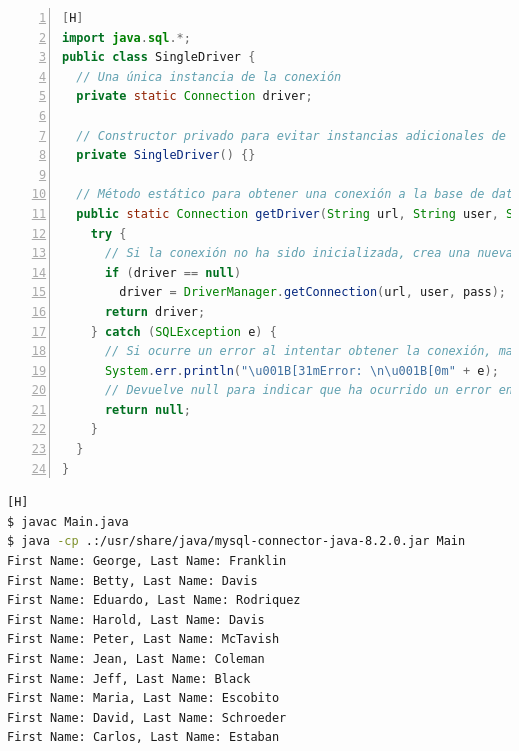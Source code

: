 \documentclass{article}
\begin{document}
      \begin{lstlisting}[language=Java, caption={SingleDriver.java}, numbers=left, firstnumber=1][H]
import java.sql.*;
public class SingleDriver {
  // Una única instancia de la conexión
  private static Connection driver;

  // Constructor privado para evitar instancias adicionales de la clase
  private SingleDriver() {}

  // Método estático para obtener una conexión a la base de datos
  public static Connection getDriver(String url, String user, String pass) {
    try {
      // Si la conexión no ha sido inicializada, crea una nueva conexión
      if (driver == null)
        driver = DriverManager.getConnection(url, user, pass);
      return driver;
    } catch (SQLException e) {
      // Si ocurre un error al intentar obtener la conexión, maneja la excepción
      System.err.println("\u001B[31mError: \n\u001B[0m" + e);
      // Devuelve null para indicar que ha ocurrido un error en la obtención de la conexión
      return null;
    }
  }
}
    	\end{lstlisting}
   		\begin{lstlisting}[language=bash,caption={Compilación y ejecución}][H]
$ javac Main.java
$ java -cp .:/usr/share/java/mysql-connector-java-8.2.0.jar Main 
First Name: George, Last Name: Franklin
First Name: Betty, Last Name: Davis
First Name: Eduardo, Last Name: Rodriquez
First Name: Harold, Last Name: Davis
First Name: Peter, Last Name: McTavish
First Name: Jean, Last Name: Coleman
First Name: Jeff, Last Name: Black
First Name: Maria, Last Name: Escobito
First Name: David, Last Name: Schroeder
First Name: Carlos, Last Name: Estaban
 
			\end{lstlisting}

\end{document}
